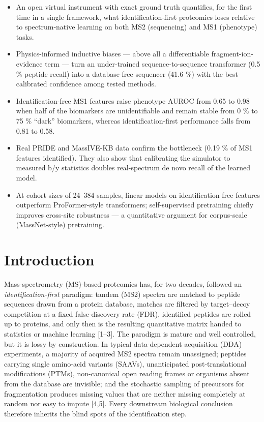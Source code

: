 \documentclass[
]{article}
\providecommand{\tightlist}{%
  \setlength{\itemsep}{0pt}\setlength{\parskip}{0pt}}
\begin{document}
\begin{itemize}
\tightlist
\item
  An open virtual instrument with exact ground truth quantifies, for the
  first time in a single framework, what identification-first proteomics
  loses relative to spectrum-native learning on both MS2 (sequencing)
  and MS1 (phenotype) tasks.
\item
  Physics-informed inductive biases --- above all a differentiable
  fragment-ion-evidence term --- turn an under-trained
  sequence-to-sequence transformer (0.5 \% peptide recall) into a
  database-free sequencer (41.6 \%) with the best-calibrated confidence
  among tested methods.
\item
  Identification-free MS1 features raise phenotype AUROC from 0.65 to
  0.98 when half of the biomarkers are unidentifiable and remain stable
  from 0 \% to 75 \% ``dark'' biomarkers, whereas identification-first
  performance falls from 0.81 to 0.58.
\item
  Real PRIDE and MassIVE-KB data confirm the bottleneck (0.19 \% of MS1
  features identified). They also show that calibrating the simulator to
  measured b/y statistics doubles real-spectrum de novo recall of the
  learned model.
\item
  At cohort sizes of 24--384 samples, linear models on
  identification-free features outperform ProFormer-style transformers;
  self-supervised pretraining chiefly improves cross-site robustness ---
  a quantitative argument for corpus-scale (MassNet-style) pretraining.
\end{itemize}

\hypertarget{introduction}{%
\section{Introduction}\label{introduction}}

Mass-spectrometry (MS)-based proteomics has, for two decades, followed
an \emph{identification-first} paradigm: tandem (MS2) spectra are
matched to peptide sequences drawn from a protein database, matches are
filtered by target--decoy competition at a fixed false-discovery rate
(FDR), identified peptides are rolled up to proteins, and only then is
the resulting quantitative matrix handed to statistics or machine
learning {[}1--3{]}. The paradigm is mature and well controlled, but it
is lossy by construction. In typical data-dependent acquisition (DDA)
experiments, a majority of acquired MS2 spectra remain unassigned;
peptides carrying single amino-acid variants (SAAVs), unanticipated
post-translational modifications (PTMs), non-canonical open reading
frames or organisms absent from the database are invisible; and the
stochastic sampling of precursors for fragmentation produces missing
values that are neither missing completely at random nor easy to impute
{[}4,5{]}. Every downstream biological conclusion therefore inherits the
blind spots of the identification step.
\end{document}
